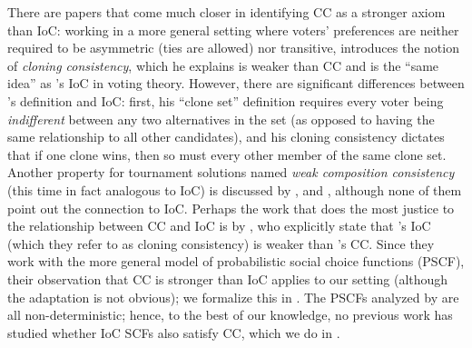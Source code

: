 There are papers that come much closer in identifying CC as a stronger axiom than IoC: working in a more general setting where voters' preferences are neither required to be asymmetric (ties are allowed)  nor transitive, \citet{Laslier00:Aggregation} introduces the notion of \textit{cloning consistency}, which he explains is weaker than CC and is the ``same idea'' as \citeauthor{Tideman87:Independence}'s IoC in voting theory. However, there are significant differences between \citeauthor{Laslier00:Aggregation}'s definition and IoC: first, his ``clone set'' definition requires every voter being \textit{indifferent} between any two alternatives in the set (as opposed to having the same relationship to all other candidates), and his cloning consistency dictates that if one clone wins, then so must every other member of the same clone set. Another property for tournament solutions named \emph{weak composition consistency} (this time in fact analogous to IoC) is discussed by \citet{Brandt18:Extending,Kruger18:Permutation}, and \citet{Laslier97:Tournament}, although none of them point out the connection to IoC. Perhaps the work that does the most justice to the relationship between CC and IoC is  by \citet{Brandl16:Consistent}, who explicitly state that \citeauthor{Tideman87:Independence}'s IoC (which they refer to as cloning consistency) is weaker than \citeauthor{Laffond96:Composition}'s CC. Since they work with the more general model of probabilistic social choice functions (PSCF), their observation that CC is stronger than IoC applies to our setting (although the adaptation is not obvious); we formalize this in . The PSCFs analyzed by \citeauthor{Brandl16:Consistent} are all non-deterministic; hence, to the best of our knowledge, no previous work has studied whether IoC SCFs also satisfy CC, which we do in .

